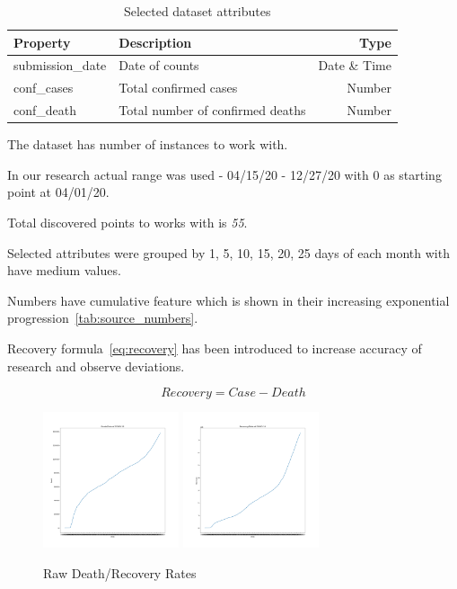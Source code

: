 \begin{table}[h]
    \centering
    \begin{tabular}{l|l|r}
    \toprule
    Property               & Description                           & Type \\\midrule
    submission\_date        & Date of counts                        & Date \& Time \\
    conf\_cases             & Total confirmed cases                 &  Number  \\
    conf\_death             & Total number of confirmed deaths      &  Number  \\
    \bottomrule
    \end{tabular}
    \caption{Selected dataset attributes ~\cite{cdc-dataset}}
    \label{tab:selected_attributes}
\end{table}


The dataset has \dbTotalInstances{} number of instances to work with.

In our research actual range was used - 04/15/20 - 12/27/20 with 0 as starting point at 04/01/20.

Total discovered points to works with is \textit{55}.

Selected attributes were grouped by 1, 5, 10, 15, 20, 25 days of each month with have medium values.

Numbers have cumulative feature which is shown in their increasing exponential progression~\ref{tab:source_numbers}.


Recovery formula~\ref{eq:recovery} has been introduced to increase accuracy of research and observe deviations.

\begin{equation}
     Recovery = Case - Death
    \label{eq:recovery}
\end{equation}

\begin{figure}[h]
    \includegraphics*[width=4cm, height=4cm]{../src/output/death.png}
    \includegraphics*[width=4cm, height=4cm]{../src/output/recovery.png}
    \caption{Raw Death/Recovery Rates}
    \label{fig:raw_data}
\end{figure}

